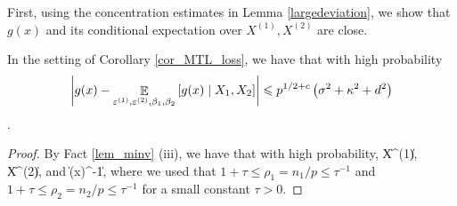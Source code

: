 First, using the concentration estimates in Lemma \ref{largedeviation}, we show that $g(x)$ and its conditional expectation over $X^{(1)}, X^{(2)}$ are close. %
 \begin{claim}\label{claim_largedev1}
 In the setting of Corollary \ref{cor_MTL_loss}, we have that with high probability
$$\left| g(x) - \mathop{\mathbb{E}}_{\varepsilon^{(1)}, \varepsilon^{(2)} ,\beta_1,\beta_2}\left[ g(x) \mid X_1, X_2  \right]\right| \leqslant p^{1/2+c} \left(\sigma^2 + \kappa^2+d^2 \right)$$.
 \end{claim}
 \begin{proof}
By Fact \ref{lem_minv} (iii), we have that with high probability,
 \be\label{op_X12}
\|X^{(1)}\|\le {}\lesssim {}, \quad \|X^{(2)}\|\le {}\lesssim {},
 \ee
 and
 \be\label{op_Sig1}
\| \hat\Sigma(x)^{-1}\|\le {}\lesssim {},
 \ee
where we used that $1+\tau\le \rho_1=n_1/p\le \tau^{-1}$ and $1+\tau\le \rho_2=n_2/p\le \tau^{-1}$ for a small constant $\tau>0$.


\end{proof}
